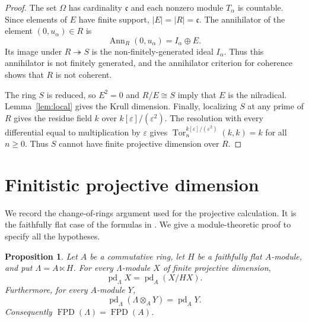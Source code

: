 \documentclass[11pt]{amsart}
\newtheorem{proposition}[theorem]{Proposition}
\theoremstyle{definition}
\DeclareMathOperator{\FPD}{FPD}
\DeclareMathOperator{\pd}{pd}
\DeclareMathOperator{\Tor}{Tor}
\DeclareMathOperator{\Ann}{Ann}
\newcommand{\cc}{\mathfrak c}
\newcommand{\eps}{\varepsilon}
\newcommand{\onto}{\twoheadrightarrow}
\numberwithin{equation}{section}
\begin{document}
\begin{proof}
The set $\Omega$ has cardinality $\cc$ and each nonzero module
$T_\alpha$ is countable. Since elements of $E$ have finite support,
$|E|=|R|=\cc$.
The annihilator of the element $(0,u_\alpha)\in R$ is
\[
 \Ann_R(0,u_\alpha)=I_\alpha\oplus E.
\]
Its image under $R\onto S$ is the non-finitely-generated ideal
$I_\alpha$. Thus this annihilator is not finitely generated, and
the annihilator criterion for coherence shows that $R$ is not
coherent.

The ring $S$ is reduced, so $E^2=0$ and $R/E\cong S$ imply that $E$ is
the nilradical. Lemma~\ref{lem:local} gives the Krull dimension.
Finally, localizing $S$ at any prime of $R$ gives the residue field
$k$ over $k[\eps]/(\eps^2)$. The resolution with every differential
equal to multiplication by $\eps$ gives
$\Tor_n^{k[\eps]/(\eps^2)}(k,k)=k$ for all $n\geq0$.
Thus $S$ cannot have finite projective dimension over $R$.
\end{proof}

\section{Finitistic projective dimension}

We record the change-of-rings argument used for the projective
calculation. It is the faithfully flat case of the formulas in
\cite[Lemma~4.4, Theorem~4.9, and Corollary~4.10]{FGR1975}.
We give a module-theoretic proof to specify all the hypotheses.

\begin{proposition}\label{prop:ff-change}
Let $A$ be a commutative ring, let $H$ be a faithfully flat
$A$-module, and put $\Lambda=A\ltimes H$. For every $\Lambda$-module
$X$ of finite projective dimension,
\begin{equation}\label{eq:pd-reduction}
 \pd_\Lambda X=\pd_A(X/HX).
\end{equation}
Furthermore, for every $A$-module $Y$,
\begin{equation}\label{eq:pd-induction}
 \pd_\Lambda(\Lambda\otimes_A Y)=\pd_A Y.
\end{equation}
Consequently $\FPD(\Lambda)=\FPD(A)$.
\end{proposition}
\end{document}
